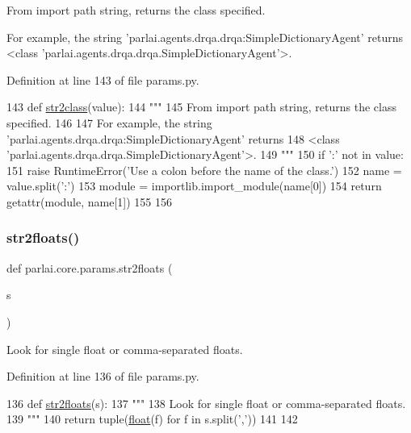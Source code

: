 \begin{DoxyVerb}From import path string, returns the class specified.

For example, the string 'parlai.agents.drqa.drqa:SimpleDictionaryAgent' returns
<class 'parlai.agents.drqa.drqa.SimpleDictionaryAgent'>.
\end{DoxyVerb}
 

Definition at line 143 of file params.\+py.


\begin{DoxyCode}
143 \textcolor{keyword}{def }\hyperlink{namespaceparlai_1_1core_1_1params_aa6083a72ad328d26016bd5f805a0b1c8}{str2class}(value):
144     \textcolor{stringliteral}{"""}
145 \textcolor{stringliteral}{    From import path string, returns the class specified.}
146 \textcolor{stringliteral}{}
147 \textcolor{stringliteral}{    For example, the string 'parlai.agents.drqa.drqa:SimpleDictionaryAgent' returns}
148 \textcolor{stringliteral}{    <class 'parlai.agents.drqa.drqa.SimpleDictionaryAgent'>.}
149 \textcolor{stringliteral}{    """}
150     \textcolor{keywordflow}{if} \textcolor{stringliteral}{':'} \textcolor{keywordflow}{not} \textcolor{keywordflow}{in} value:
151         \textcolor{keywordflow}{raise} RuntimeError(\textcolor{stringliteral}{'Use a colon before the name of the class.'})
152     name = value.split(\textcolor{stringliteral}{':'})
153     module = importlib.import\_module(name[0])
154     \textcolor{keywordflow}{return} getattr(module, name[1])
155 
156 
\end{DoxyCode}
\mbox{\label{namespaceparlai_1_1core_1_1params_a3ef8c61c55a77674dd852c5b9f21e560}} 
\subsubsection{\texorpdfstring{str2floats()}{str2floats()}}
{\footnotesize\ttfamily def parlai.\+core.\+params.\+str2floats (\begin{DoxyParamCaption}\item[{}]{s }\end{DoxyParamCaption})}

\begin{DoxyVerb}Look for single float or comma-separated floats.
\end{DoxyVerb}
 

Definition at line 136 of file params.\+py.


\begin{DoxyCode}
136 \textcolor{keyword}{def }\hyperlink{namespaceparlai_1_1core_1_1params_a3ef8c61c55a77674dd852c5b9f21e560}{str2floats}(s):
137     \textcolor{stringliteral}{"""}
138 \textcolor{stringliteral}{    Look for single float or comma-separated floats.}
139 \textcolor{stringliteral}{    """}
140     \textcolor{keywordflow}{return} tuple(\hyperlink{namespaceprojects_1_1controllable__dialogue_1_1make__control__dataset_aa2b7207688c641dbc094ab44eca27113}{float}(f) \textcolor{keywordflow}{for} f \textcolor{keywordflow}{in} s.split(\textcolor{stringliteral}{','}))
141 
142 
\end{DoxyCode}
